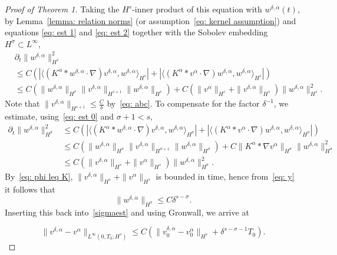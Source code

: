 \documentclass{amsart}
\begin{document}
\begin{proof}[Proof of Theorem 1]
Taking the $H^s$-inner product of this equation with $w^{\delta,\alpha}(t)$, by Lemma~\ref{lemma: relation norms} (or assumption~\eqref{eq: kernel assumption}) and equations \eqref{eq: est 1} and \eqref{eq: est 2} together with the Sobolev embedding $H^\sigma\subset L^\infty$,
\begin{equation}
\label{sigmaest}
\begin{aligned}
& \partial_t \|w^{\delta,\alpha} \|_{H^s}^2 \\ &\leq C(|\langle (K^{\alpha}*w^{\delta,\alpha} \cdot \nabla)v^{\delta,\alpha}, w^{\delta,\alpha} \rangle_{H^s}| + |\langle (K^{\alpha}*v^{\alpha} \cdot \nabla) w^{\delta,\alpha}, w^{\delta,\alpha}\rangle_{H^s}|)\\
&\leq C (\|w^{\delta,\alpha}\|_{H^{\sigma}} \| v^{\delta,\alpha}\|_{H^{s+1}}\|w^{\delta,\alpha}\|_{H^s}) +   C(\|v^{\alpha}\|_{H^s} + \|v^{\delta,\alpha}\|_{H^s} ) \|w^{\delta,\alpha}\|_{H^s}^2.
\end{aligned}
\end{equation}
Note that $ \| v^{\delta,\alpha}\|_{H^{s+1}} \leq \frac{C}{\delta}$ by~\eqref{eq: abc}. To compensate for the factor $\delta^{-1}$, we estimate, using~\eqref{eq: est 0} and $\sigma+1<s$, 
\begin{equation*} 
\begin{aligned}
\partial_t \|w^{\delta,\alpha} \|_{H^\sigma}^2 &\leq C(|\langle (K^{\alpha}*w^{\delta,\alpha} \cdot \nabla)v^{\delta,\alpha}, w^{\delta,\alpha} \rangle_{H^\sigma}| + |\langle (K^{\alpha}*v^{\alpha} \cdot \nabla) w^{\delta,\alpha}, w^{\delta,\alpha}\rangle_{H^\sigma}|)\\
&\leq C (\|w^{\delta,\alpha}\|_{H^{\sigma}} \| v^{\delta,\alpha}\|_{H^{\sigma+1}}\|w^{\delta,\alpha}\|_{H^\sigma}) +  C \|K^{\alpha}*\nabla v^{\alpha}\|_{H^\sigma}  \|w^{\delta,\alpha}\|_{H^\sigma}^2\\
&\leq  C (\|v^{\delta,\alpha}\|_{H^s}+\|v^{\alpha}\|_{H^s})  \|w^{\delta,\alpha}\|_{H^\sigma}^2.
\end{aligned}
\end{equation*}
By~\eqref{eq: phi leq K}, $\|v^{\delta,\alpha}\|_{H^s}+\|v^{\alpha}\|_{H^s}$ is bounded in time, hence from~\eqref{eq: y} it follows that 
\begin{equation*}
 \|w^{\delta,\alpha} \|_{H^\sigma}\leq C \delta^{s-\sigma}.
\end{equation*} 
Inserting this back into~\eqref{sigmaest} and using Gronwall, we arrive at

\begin{equation*}
 \|v^{\delta, \alpha}-v^{\alpha}\|_{L^{\infty}(0,T_0;H^s)} \leq C(\|v_0^{\delta,\alpha}-v_0^\alpha\|_{H^s}+\delta^{s-\sigma-1}T_0).
\end{equation*}



\end{proof}
\end{document}
